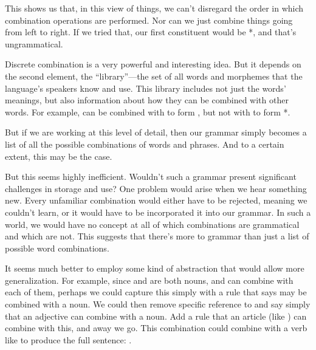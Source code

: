 This shows us that, in this view of things, we can't disregard the order in which combination operations are performed. Nor can we just combine things going from left to right. If we tried that, our first constituent would be *, and that's ungrammatical.

Discrete combination is a very powerful and interesting idea. But it depends on the second element, the ``library''---the set of all words and morphemes that the language's speakers know and use. This library includes not just the words' meanings, but also information about how they can be combined with other words. For example,  can be combined with  to form , but not with  to form *.

But if we are working at this level of detail, then our grammar simply becomes a list of all the possible combinations of words and phrases. And to a certain extent, this may be the case. \citet[47]{Culicover1999}

\ea
    \z
\z


But this seems highly inefficient. Wouldn't such a grammar present significant challenges in storage and use? One problem would arise when we hear something new. Every unfamiliar combination would either have to be rejected, meaning we couldn't learn, or it would have to be incorporated it into our grammar. In such a world, we would have no concept at all of which combinations are grammatical and which are not. This suggests that there's more to grammar than just a list of possible word combinations.

It seems much better to employ some kind of abstraction that would allow more generalization. For example, since  and  are both nouns, and  can combine with each of them, perhaps we could capture this simply with a rule that says  may be combined with a noun. We could then remove specific reference to  and say simply that an adjective can combine with a noun. Add a rule that an article (like ) can combine with this, and away we go. This combination could combine with a verb like  to produce the full sentence: .

